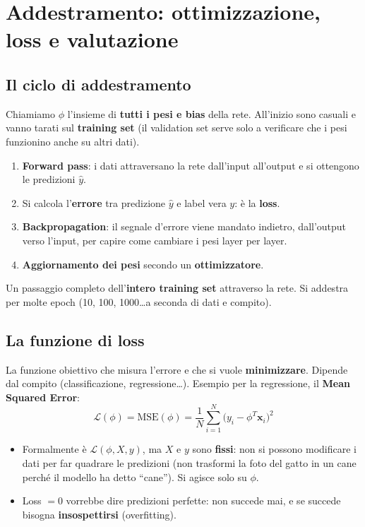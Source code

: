 \chapter{Addestramento: ottimizzazione, loss e valutazione}
\label{cap:addestramento}
\section{Il ciclo di addestramento}
Chiamiamo $\phi$ l'insieme di \textbf{tutti i pesi e bias} della rete. All'inizio sono casuali e vanno tarati sul
\textbf{training set} (il validation set serve solo a verificare che i pesi funzionino anche su altri dati).
\begin{enumerate}
  \item \textbf{Forward pass}: i dati attraversano la rete dall'input all'output e si ottengono le predizioni $\hat{y}$.
  \item Si calcola l'\textbf{errore} tra predizione $\hat{y}$ e label vera $y$: è la \textbf{loss}.
  \item \textbf{Backpropagation}: il segnale d'errore viene mandato indietro, dall'output verso l'input, per capire come
        cambiare i pesi layer per layer.
  \item \textbf{Aggiornamento dei pesi} secondo un \textbf{ottimizzatore}.
\end{enumerate}
\begin{definizione}[epoch]
Un passaggio completo dell'\textbf{intero training set} attraverso la rete. Si addestra per molte epoch
(10, 100, 1000\ldots a seconda di dati e compito).
\end{definizione}

\section{La funzione di loss}
\begin{definizione}
La funzione obiettivo che misura l'errore e che si vuole \textbf{minimizzare}. Dipende dal compito
(classificazione, regressione\ldots). Esempio per la regressione, il \textbf{Mean Squared Error}:
\[
\mathcal{L}(\phi) = \mathrm{MSE}(\phi) = \frac{1}{N}\sum_{i=1}^{N}\big(y_i - \phi^T\mathbf{x}_i\big)^2
\]
\end{definizione}
\begin{itemize}
  \item Formalmente è $\mathcal{L}(\phi, X, y)$, ma $X$ e $y$ sono \textbf{fissi}: non si possono modificare i dati per far
        quadrare le predizioni (non trasformi la foto del gatto in un cane perché il modello ha detto ``cane''). Si agisce solo su $\phi$.
  \item Loss $=0$ vorrebbe dire predizioni perfette: non succede mai, e se succede bisogna \textbf{insospettirsi} (overfitting).
\end{itemize}

